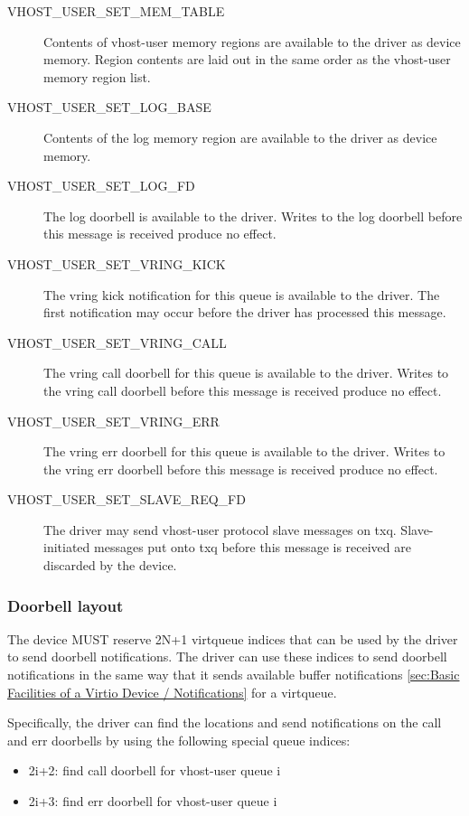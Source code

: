 \begin{description}
\item[VHOST_USER_SET_MEM_TABLE] Contents of vhost-user memory regions are available to the driver as device memory. Region contents are laid out in the same order as the vhost-user memory region list.
\item[VHOST_USER_SET_LOG_BASE] Contents of the log memory region are available to the driver as device memory.
\item[VHOST_USER_SET_LOG_FD] The log doorbell is available to the driver.  Writes to the log doorbell before this message is received produce no effect.
\item[VHOST_USER_SET_VRING_KICK] The vring kick notification for this queue is available to the driver.  The first notification may occur before the driver has processed this message.
\item[VHOST_USER_SET_VRING_CALL] The vring call doorbell for this queue is available to the driver.  Writes to the vring call doorbell before this message is received produce no effect.
\item[VHOST_USER_SET_VRING_ERR] The vring err doorbell for this queue is available to the driver.  Writes to the vring err doorbell before this message is received produce no effect.
\item[VHOST_USER_SET_SLAVE_REQ_FD] The driver may send vhost-user protocol slave messages on txq.  Slave-initiated messages put onto txq before this message is received are discarded by the device.
\end{description}

\subsubsection{Doorbell layout}\label{sec:Device Types / Vhost-user Device Backend / Additional Device Resources / Doorbell layout}

The device MUST reserve 2N+1 virtqueue indices that can be used by the driver to
send doorbell notifications. The driver can use these indices to send doorbell
notifications in the same way that it sends available buffer notifications
\ref{sec:Basic Facilities of a Virtio Device / Notifications} for a virtqueue.

Specifically, the driver can find the locations and send notifications on the
call and err doorbells by using the following special queue indices:

\begin{itemize}
\item 2i+2: find call doorbell for vhost-user queue i
\item 2i+3: find err doorbell for vhost-user queue i
\end{itemize}

